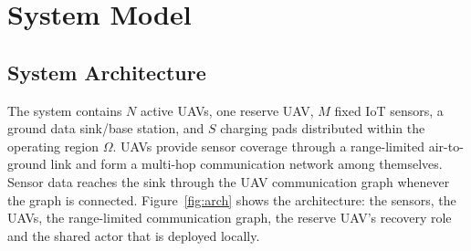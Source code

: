 \documentclass[conference]{IEEEtran}
\begin{document}
\section{System Model}
\label{sec:system}

\subsection{System Architecture}
The system contains $N$ active UAVs, one reserve UAV, $M$ fixed IoT sensors, a ground data sink/base station, and $S$ charging pads distributed within the operating region $\Omega$. UAVs provide sensor coverage through a range-limited air-to-ground link and form a multi-hop communication network among themselves. Sensor data reaches the sink through the UAV communication graph whenever the graph is connected. Figure~\ref{fig:arch} shows the architecture: the sensors, the UAVs, the range-limited communication graph, the reserve UAV's recovery role and the shared actor that is deployed locally.
\end{document}
